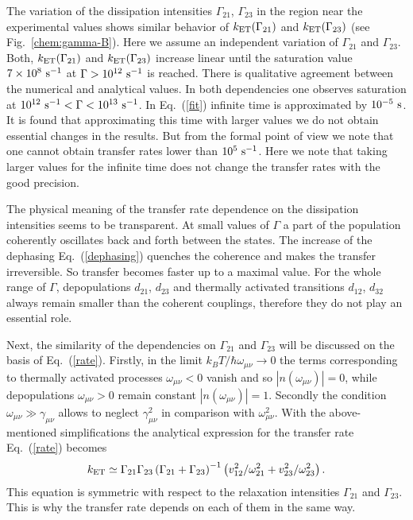\documentclass[12pt,twoside,a4paper]{report}
\begin{document}
The variation of the dissipation
intensities $\Gamma_{21}$, $\Gamma_{23}$ in the region near the experimental
values shows 
similar behavior of $k_{\rm ET}(\Gamma_{21})$ and $k_{\rm ET}(\Gamma_{23})$
(see Fig.~\ref{chem:gamma-B}).
Here we assume an independent 
variation of $\Gamma_{21}$ and $\Gamma_{23}$.
Both, $k_{\rm ET}(\Gamma_{21})$
and $k_{\rm ET}(\Gamma_{23})$ increase linear until the saturation value
$7\times{}10^{8} ~{\rm s}^{-1}$ at $\Gamma>10^{12} ~{\rm s}^{-1}$ is reached.
There is qualitative agreement
between the numerical and analytical values.
In both dependencies one observes saturation  at  
 $10^{12} ~{\rm s}^{-1}<\Gamma<10^{13} ~{\rm s}^{-1}$.
In Eq.~(\ref{fit}) 
infinite time is approximated by $10^{-5} ~{\rm s}$.
It is found that  approximating this time with larger values
we do not obtain essential changes in the results.
But from the formal point of view we note that
one
cannot obtain transfer rates lower 
than $10^5~{\rm s}^{-1}$.
Here we note that taking larger values for the infinite time 
does not change the transfer rates with the good precision.

The physical meaning of 
the transfer rate dependence on the dissipation intensities 
seems to be transparent.
At small values of $\Gamma$ a part of the population coherently oscillates
back and forth
between the states. The increase of the dephasing
Eq.~(\ref{dephasing}) quenches the coherence and makes 
the transfer irreversible.
So transfer becomes faster up to a maximal value.
For the whole range of $\Gamma$, depopulations $d_{21}$, $d_{23}$
and thermally activated transitions $d_{12}$, $d_{32}$
always remain smaller than the coherent couplings,
therefore they do not play an essential role.
 




Next, the similarity of the dependencies 
on $\Gamma_{21}$ and $\Gamma_{23}$ will be 
discussed on the basis of 
Eq.~(\ref{rate}).
Firstly,
in the limit $k_B T / \hbar \omega_{ \mu \nu } \rightarrow 0$
the terms corresponding to thermally 
activated processes $\omega_{ \mu \nu }<0$
vanish and so
$|n(\omega_{ \mu \nu })|=0$, while
depopulations  $\omega_{ \mu \nu }>0$ remain constant  
$|n(\omega_{ \mu \nu })|=1$.
Secondly
the condition $\omega_{ \mu \nu } \gg{}\gamma_{ \mu \nu }$
allows to neglect $\gamma^2_{ \mu \nu }$ in comparison with
$\omega^2_{ \mu \nu }$.
With the above-mentioned simplifications
the analytical expression for the transfer rate Eq.~(\ref{rate})
becomes
\begin{eqnarray}
\label{symmetric}
k_{\rm ET}
           \simeq
                  \Gamma_{21}\Gamma_{23}
                  \left(
                       \Gamma_{21}
                    +  \Gamma_{23}
                  \right)^{-1}
                  \left(
                       v_{12}^2/\omega_{21}^2
                    +  v_{23}^2/\omega_{23}^2
                  \right).
\end{eqnarray}
This equation is symmetric with respect to the 
relaxation intensities $\Gamma_{21}$ and $\Gamma_{23}$.
This is why the transfer rate depends on each of them
in the same way.
\end{document}
